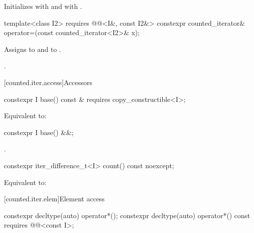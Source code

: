 \begin{itemdescr}
\pnum
\effects
Initializes  with  and
 with .
\end{itemdescr}

%
\begin{itemdecl}
template<class I2>
  requires @@<I&, const I2&>
    constexpr counted_iterator& operator=(const counted_iterator<I2>& x);
\end{itemdecl}

\begin{itemdescr}
\pnum
\effects
Assigns  to  and
 to .

\pnum
\returns
{}.
\end{itemdescr}

[counted.iter.access]{Accessors}

%
\begin{itemdecl}
constexpr I base() const & requires copy_constructible<I>;
\end{itemdecl}

\begin{itemdescr}
\pnum
\effects
Equivalent to: 
\end{itemdescr}

%
\begin{itemdecl}
constexpr I base() &&;
\end{itemdecl}

\begin{itemdescr}
\pnum
\returns
{}.
\end{itemdescr}

%
\begin{itemdecl}
constexpr iter_difference_t<I> count() const noexcept;
\end{itemdecl}

\begin{itemdescr}
\pnum
\effects
Equivalent to: 
\end{itemdescr}

[counted.iter.elem]{Element access}

%
\begin{itemdecl}
constexpr decltype(auto) operator*();
constexpr decltype(auto) operator*() const
  requires @@<const I>;
\end{itemdecl}

